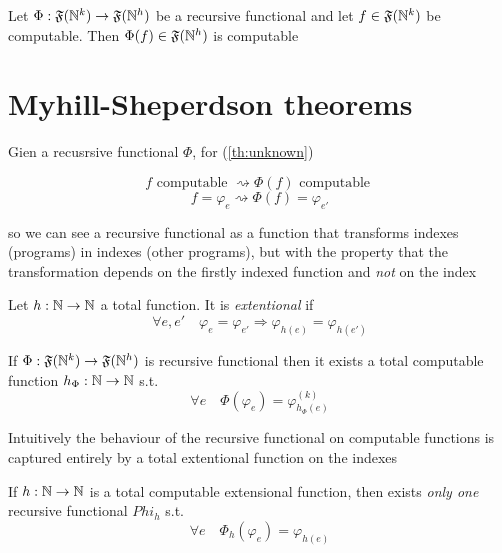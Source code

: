 \begin{theorem}\label{th:unknown}
  Let $\Phi : \mathfrak{F}(\mathbb{N}^k) \rightarrow \mathfrak{F}(\mathbb{N}^h)$
  be a recursive functional and let $f \in \mathfrak{F}(\mathbb{N}^k)$ be
  computable. Then $\Phi(f) \in \mathfrak{F}(\mathbb{N}^h)$ is computable
\end{theorem}

\section{Myhill-Sheperdson theorems}
Gien a recusrsive functional $\Phi$, for (\ref{th:unknown})

\[
  f \mbox{ computable } \rightsquigarrow \Phi(f) \mbox{ computable }
\]
\[
  f = \varphi_e \rightsquigarrow \Phi(f) = \varphi_{e'}
\]

so we can see a recursive functional as a function that transforms
indexes (programs) in indexes (other programs), but with the property
that the transformation depends on the firstly indexed function and
\emph{not} on the index

\begin{definition}
  Let $h : \mathbb{N} \rightarrow \mathbb{N}$ a total function. It is \emph{extentional} if
  \[
    \forall e,e' \quad \varphi_e = \varphi_{e'} \Rightarrow
    \varphi_{h(e)} = \varphi_{h(e')}
  \]
\end{definition}

\begin{theorem}
  If $\Phi : \mathfrak{F}(\mathbb{N}^k) \rightarrow \mathfrak{F}(\mathbb{N}^h)$ is
  recursive functional then it exists a total computable function
  $h_\Phi : \mathbb{N} \rightarrow \mathbb{N}$ s.t.
  \[
    \forall e \quad \Phi(\varphi_e) = \varphi_{h_\Phi(e)}^{(k)}
  \]
\end{theorem}

Intuitively the behaviour of the recursive functional on computable
functions is captured entirely by a total extentional function on the
indexes

\begin{theorem}
  If $h : \mathbb{N} \rightarrow \mathbb{N}$ is a total computable extensional function, then
  exists \emph{only one} recursive functional $Phi_h$ s.t.
  \[
    \forall e \quad \Phi_h(\varphi_e) = \varphi_{h(e)}
  \]
\end{theorem}